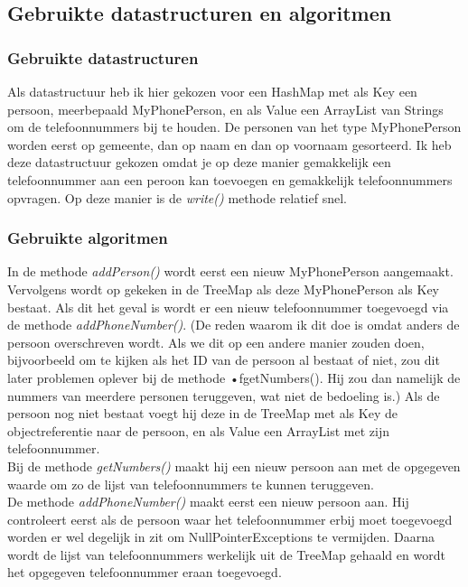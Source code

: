 \documentclass[10pt,a4paper]{report}
\begin{document}
\subsection*{Gebruikte datastructuren en algoritmen}
\subsubsection*{Gebruikte datastructuren}
Als datastructuur heb ik hier gekozen voor een HashMap met als Key een persoon, meerbepaald MyPhonePerson, en als Value een ArrayList van Strings om de telefoonnummers bij te houden. De personen van het type MyPhonePerson worden eerst op gemeente, dan op naam en dan op voornaam gesorteerd. Ik heb deze datastructuur gekozen omdat je op deze manier gemakkelijk een telefoonnummer aan een peroon kan toevoegen en gemakkelijk telefoonnummers opvragen. Op deze manier is de \textsl{write()} methode relatief snel.

\subsubsection*{Gebruikte algoritmen}
In de methode \textsl{addPerson()} wordt eerst een nieuw MyPhonePerson aangemaakt. Vervolgens wordt op gekeken in de TreeMap als deze MyPhonePerson als Key bestaat. Als dit het geval is wordt er een nieuw telefoonnummer toegevoegd via de methode \textsl{addPhoneNumber()}. (De reden waarom ik dit doe is omdat anders de persoon overschreven wordt. Als we dit op een andere manier zouden doen, bijvoorbeeld om te kijken als het ID van de persoon al bestaat of niet, zou dit later problemen oplever bij de methode \textsc{•}f{getNumbers()}. Hij zou dan namelijk de nummers van meerdere personen teruggeven, wat niet de bedoeling is.) Als de persoon nog niet bestaat voegt hij deze in de TreeMap met als Key de objectreferentie naar de persoon, en als Value een ArrayList met zijn telefoonnummer.\\

Bij de methode \textsl{getNumbers()} maakt hij een nieuw persoon aan met de opgegeven waarde om zo de lijst van telefoonnummers te kunnen teruggeven.\\

De methode \textsl{addPhoneNumber()} maakt eerst een nieuw persoon aan. Hij controleert eerst als de persoon waar het telefoonnummer erbij moet toegevoegd worden er wel degelijk in zit om NullPointerExceptions te vermijden. Daarna wordt de lijst van telefoonnummers werkelijk uit de TreeMap gehaald en wordt het opgegeven telefoonnummer eraan toegevoegd.\\
\end{document}
